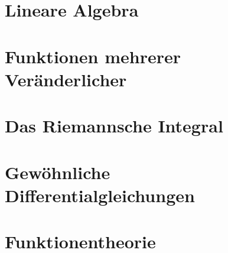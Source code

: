 \documentclass[a4paper]{report}
\begin{document}

\chapter{Lineare Algebra}


\chapter{Funktionen mehrerer Veränderlicher}


\chapter{Das Riemannsche Integral}


\chapter{Gewöhnliche Differentialgleichungen}


\chapter{Funktionentheorie}

\end{document}
